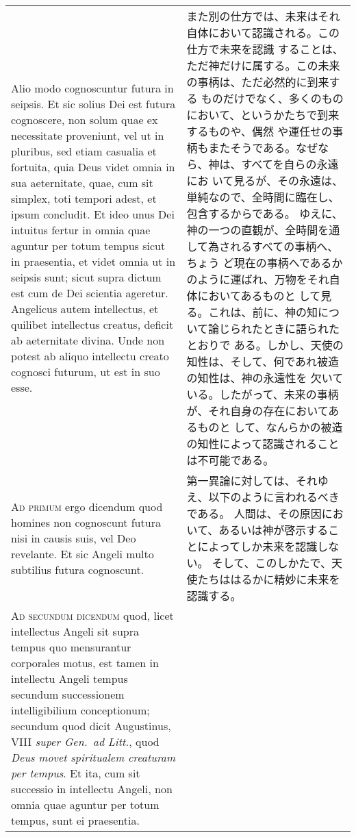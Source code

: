 \documentclass[10pt]{jsarticle} %
\begin{document}
\begin{longtable}{p{21em}p{21em}}
 \\

 Alio modo cognoscuntur
futura in seipsis. Et sic solius Dei est futura cognoscere, non solum
quae ex necessitate proveniunt, vel ut in pluribus, sed etiam casualia
et fortuita, quia Deus videt omnia in sua aeternitate, quae, cum sit
simplex, toti tempori adest, et ipsum concludit. Et ideo unus Dei
intuitus fertur in omnia quae aguntur per totum tempus sicut in
praesentia, et videt omnia ut in seipsis sunt; sicut supra dictum est
cum de Dei scientia ageretur. Angelicus autem intellectus, et quilibet
intellectus creatus, deficit ab aeternitate divina. Unde non potest ab
aliquo intellectu creato cognosci futurum, ut est in suo esse.


&

また別の仕方では、未来はそれ自体において認識される。この仕方で未来を認識
 することは、ただ神だけに属する。この未来の事柄は、ただ必然的に到来する
 ものだけでなく、多くのものにおいて、というかたちで到来するものや、偶然
 や運任せの事柄もまたそうである。なぜなら、神は、すべてを自らの永遠にお
 いて見るが、その永遠は、単純なので、全時間に臨在し、包含するからである。
 ゆえに、神の一つの直観が、全時間を通して為されるすべての事柄へ、ちょう
 ど現在の事柄へであるかのように運ばれ、万物をそれ自体においてあるものと
 して見る。これは、前に、神の知について論じられたときに語られたとおりで
 ある。しかし、天使の知性は、そして、何であれ被造の知性は、神の永遠性を
 欠いている。したがって、未来の事柄が、それ自身の存在においてあるものと
 して、なんらかの被造の知性によって認識されることは不可能である。
 

\\


{\scshape Ad primum} ergo dicendum quod homines non
cognoscunt futura nisi in causis suis, vel Deo revelante. Et sic Angeli
multo subtilius futura cognoscunt.

&

 第一異論に対しては、それゆえ、以下のように言われるべきである。
 人間は、その原因において、あるいは神が啓示することによってしか未来を認識しない。
 そして、このしかたで、天使たちははるかに精妙に未来を認識する。
 
\\


{\scshape Ad secundum dicendum} quod, licet intellectus
Angeli sit supra tempus quo mensurantur corporales motus, est tamen in
intellectu Angeli tempus secundum successionem intelligibilium
conceptionum; secundum quod dicit Augustinus, VIII {\itshape super Gen.~ad Litt.},
quod {\itshape Deus movet spiritualem creaturam per tempus}. Et ita, cum sit
successio in intellectu Angeli, non omnia quae aguntur per totum tempus,
sunt ei praesentia.


\end{longtable}
\end{document}
